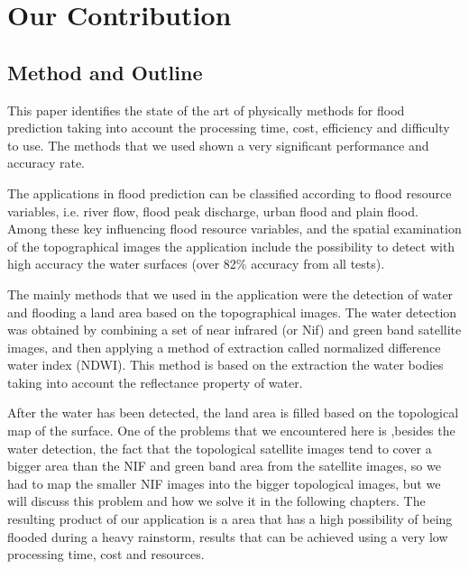 \documentclass[12pt, a4paper]{report}
\begin{document}
\section{Our Contribution}
\subsection{Method and Outline}

This paper identifies the state of the art of physically methods for flood prediction taking into account the processing time, cost, efficiency and difficulty to use. The methods that we used shown a very significant performance and accuracy rate.
\par

The applications in flood prediction can be classified according to flood resource variables, i.e. river flow, flood peak discharge, urban flood and plain flood. Among these key influencing flood resource variables, and the spatial examination of the topographical images the application include the possibility to detect with high accuracy the water surfaces (over 82\% accuracy from all tests).
\par

The mainly methods that we used in the application were the detection of water and flooding a land area based on the topographical images. The water detection was obtained by combining a set of near infrared (or Nif) and green band satellite images, and then applying a method of extraction called normalized difference water index (NDWI). This method is based on the extraction the water bodies taking into account the reflectance property of water.
\par 

After the water has been detected, the land area is filled based on the topological map of the surface. One of the problems that we encountered here is ,besides the water detection, the fact that the topological satellite images tend to cover a bigger area than the NIF and green band area from the satellite images, so we had to map the smaller NIF images into the bigger topological images, but we will discuss this problem and how we solve it in the following chapters. The resulting product of our application is a area that has a high possibility of being flooded during a heavy rainstorm, results that can be achieved using a very low processing time, cost and resources.
\par 
\end{document}
